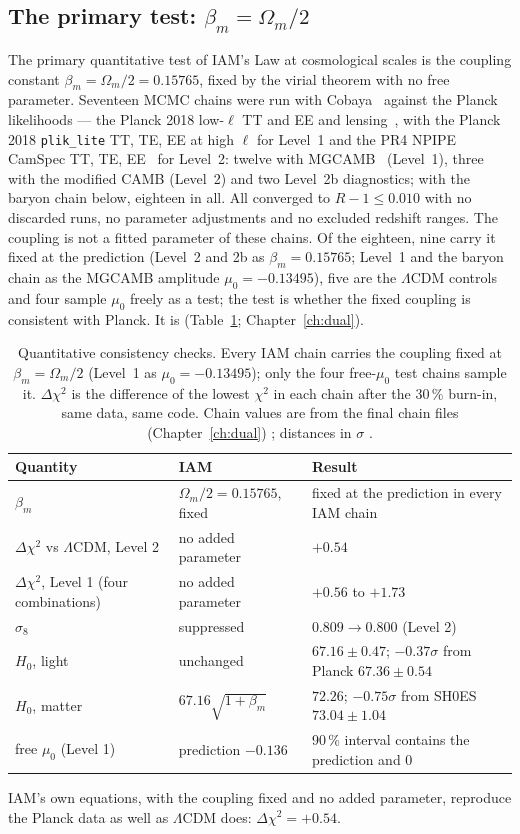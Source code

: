\subsection{The primary test: $\beta_m=\Omega_m/2$}
The primary quantitative test of IAM's Law at cosmological scales is the coupling constant $\beta_m=\Omega_m/2=0.15765$, fixed by the virial theorem with no
free parameter. Seventeen MCMC chains were run with Cobaya~\cite{Torrado2021} against the Planck likelihoods --- the Planck 2018 low-$\ell$ TT and EE and lensing~\cite{Planck2018V,Planck2018VIII}, with the Planck 2018 \texttt{plik\_lite} TT, TE, EE at high $\ell$ for Level~1 and the PR4 NPIPE CamSpec TT, TE, EE~\cite{Rosenberg2022} for Level~2: twelve with MGCAMB~\cite{Hojjati2011} (Level~1), three with the modified CAMB (Level~2) and two Level~2b diagnostics; with the baryon chain below, eighteen in all. All converged to $R-1\le0.010$
with no discarded runs, no parameter adjustments and no excluded redshift ranges. The coupling is not a fitted parameter of these chains. Of the eighteen, nine carry it fixed at the prediction (Level~2 and 2b as
$\beta_m=0.15765$; Level~1 and the baryon chain as the MGCAMB amplitude $\mu_0=-0.13495$), five are the $\Lambda$CDM controls and four sample $\mu_0$ freely as a test; the test is whether the fixed coupling is consistent with Planck. It is (Table~\ref{tab:law_consistency}; Chapter~\ref{ch:dual}).

\begin{table}[htbp]\centering
\caption{Quantitative consistency checks. Every IAM chain carries the coupling fixed at $\beta_m=\Omega_m/2$ (Level~1 as $\mu_0=-0.13495$); only the four free-$\mu_0$ test chains sample it. $\Delta\chi^2$ is the difference of the lowest $\chi^2$ in each chain after the 30\,\% burn-in, same data, same code. Chain values are from the
final chain files (Chapter~\ref{ch:dual}) \measured; distances in $\sigma$ \calc.}\label{tab:law_consistency}
\begin{tabularx}{\linewidth}{>{\raggedright\arraybackslash}Xll}
\hline
Quantity & IAM & Result\\\hline
$\beta_m$ & $\Omega_m/2=0.15765$, fixed & fixed at the prediction in every IAM chain\\
$\Delta\chi^2$ vs $\Lambda$CDM, Level 2 & no added parameter & $+0.54$\\
$\Delta\chi^2$, Level 1 (four combinations) & no added parameter & $+0.56$ to $+1.73$\\
$\sigma_8$ & suppressed & $0.809\to0.800$ (Level 2)\\
$H_0$, light & unchanged & $67.16\pm0.47$; $-0.37\sigma$ from Planck $67.36\pm0.54$\\
$H_0$, matter & $67.16\sqrt{1+\beta_m}$ & $72.26$; $-0.75\sigma$ from SH0ES $73.04\pm1.04$~\cite{Riess2022}\\
free $\mu_0$ (Level 1) & prediction $-0.136$ & 90\,\% interval contains the prediction and $0$\\\hline
\end{tabularx}
\end{table}
IAM's own equations, with the coupling fixed and no added parameter, reproduce the Planck data as well as $\Lambda$CDM does: $\Delta\chi^2=+0.54$.


